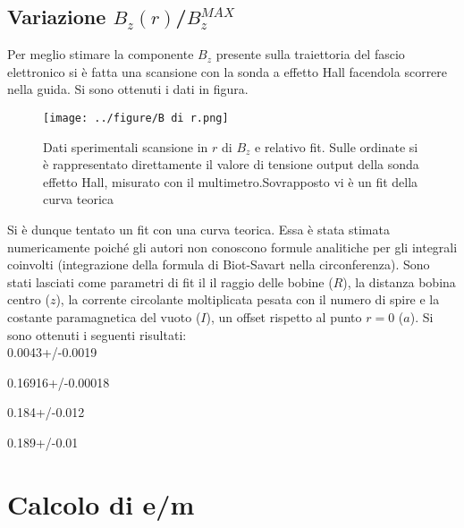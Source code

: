 \documentclass[10pt,a4paper]{article}
\begin{document}
\subsection{Variazione $B_z(r)$/$B_z^{MAX}$}

Per meglio stimare la componente $B_z$ presente sulla traiettoria del fascio elettronico si è fatta una scansione con la sonda a effetto Hall facendola scorrere nella guida. Si sono ottenuti i dati in figura.\\

\begin{figure}[h!]
	\centering
	\texttt{[image: ../figure/B di r.png]}
	\caption{Dati sperimentali scansione in $r$ di $B_z$ e relativo fit. Sulle ordinate si è rappresentato direttamente il valore di tensione output della sonda effetto Hall, misurato con il multimetro.Sovrapposto vi è un fit della curva teorica}
	\label{task6.3}
\end{figure}

Si è dunque tentato un fit con una curva teorica. Essa è stata stimata numericamente poiché gli autori non conoscono formule analitiche per gli integrali coinvolti (integrazione della formula di Biot-Savart nella circonferenza). Sono stati lasciati come parametri di fit il il raggio delle bobine ($R$), la distanza bobina centro ($z$), la corrente circolante moltiplicata pesata con il numero di spire e la costante paramagnetica del vuoto ($I$), un offset rispetto al punto $r=0$ ($a$). Si sono ottenuti i seguenti risultati:\\

0.0043+/-0.0019

0.16916+/-0.00018

0.184+/-0.012

0.189+/-0.01

 
 

\section{Calcolo di e/m}


\end{document}
